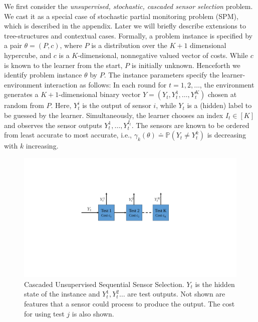 \documentclass[11pt]{article} %
\newcommand{\todoc}[2][]{\todo[color=Apricot!20,size=\tiny,#1]{Cs: #2}}
\newcommand{\ses}{sensor selection\xspace}
\newcommand{\Prob}[1]{\mathbb{P}\left(#1\right)}
\begin{document}
We first consider the {\it unsupervised, stochastic, 
cascaded \ses} problem. We cast it as a special case of stochastic partial monitoring problem (SPM), which is described in the appendix.
Later we will briefly describe extensions to tree-structures and contextual cases. %
Formally, 
a problem instance is specified by a pair $\theta = (P,c)$, where $P$ is
a distribution over the $K+1$ dimensional hypercube, and $c$ is a $K$-dimensional, nonnegative valued vector
of costs.
While $c$ is known to the learner from the start, $P$ is initially unknown. Henceforth we identify problem instance $\theta$ by $P$. 
The instance parameters specify the learner-environment interaction as follows:
In each round for $t=1,2,\dots$, 
the environment generates a $K+1$-dimensional binary vector
$Y = (Y_t,Y_t^1,\dots,Y_t^K)$ chosen at random from $P$.
Here, $Y_t^i$ is the output of sensor $i$, while $Y_t$ is a (hidden) label to be guessed by the learner.
Simultaneously, the learner chooses an index $I_t\in [K]$ and observes the sensor outputs $Y_t^1,\dots,Y_t^{I_t}$.
The sensors are known to be ordered from least accurate to most accurate, 
i.e., $\gamma_k(\theta) \doteq \Prob{Y_t\ne Y_t^k}$ is decreasing with $k$ increasing.
\begin{figure}[!h]
	\centering
	\includegraphics[scale=.4]{cascade.pdf}
	\caption{\footnotesize Cascaded Unsupervised Sequential Sensor Selection. $Y_t$ is the hidden state of the instance and $Y_t^1, Y_t^2 \ldots$ are test outputs. Not shown are features that a sensor could process to produce the output. The cost for using test $j$ is also shown.}
	\label{fig:SensorCascade}
	\vspace{-.2cm}
\end{figure} 
\end{document}
